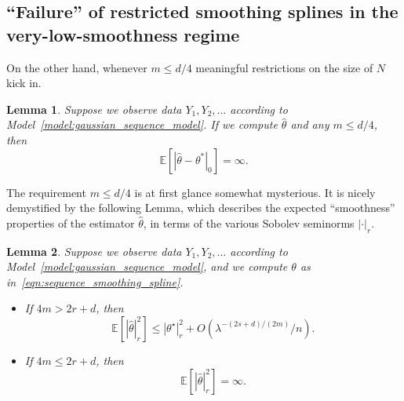 \documentclass{article}
\newcommand{\1}{\mathbf{1}}
\newcommand{\Ebb}{\mathbb{E}}
\newcommand{\wh}[1]{\widehat{#1}}
\theoremstyle{alden}
\theoremstyle{aldenthm}
\newtheorem{lemma}{Lemma}
\theoremstyle{definition}
\theoremstyle{remark}
\begin{document}
\subsection{``Failure'' of restricted smoothing splines in the very-low-smoothness regime}
On the other hand, whenever $m \leq d/4$ meaningful restrictions on the size of $N$ kick in.
\begin{lemma}
	\label{lem:failure_very_low_smoothness}
	Suppose we observe data $Y_1,Y_2,\ldots$ according to Model~\eqref{model:gaussian_sequence_model}. If we compute $\wh{\theta}$ and any $m \leq d/4$, then
	\begin{equation}
	\label{eqn:failure_very_low_smoothness}
	\Ebb[|\wh{\theta} - \theta^{\ast}|_{0}] = \infty.
	\end{equation}
\end{lemma}
The requirement $m \leq d/4$ is at first glance somewhat mysterious. It is nicely demystified by the following Lemma, which describes the expected ``smoothness'' properties of the estimator $\wh{\theta}$, in terms of the various Sobolev seminorms $|\cdot|_r$.
\begin{lemma}
	\label{lem:smoothness_of_sequence_smoothing_splines}
	Suppose we observe data $Y_1,Y_2,\ldots$ according to Model~\eqref{model:gaussian_sequence_model}, and we compute $\theta$ as in~\eqref{eqn:sequence_smoothing_spline}.
	\begin{itemize}
		\item If $4m > 2r + d$, then
		\begin{equation}
		\label{eqn:smoothness_of_sequence_smoothing_splines_1}
		\Ebb[|\wh{\theta}|_{r}^2] \leq |\theta^{\star}|_r^2 + O(\lambda^{-(2s + d)/(2m)}/n).
		\end{equation}
		\item If $4m \leq 2r + d$, then 
		\begin{equation}
		\label{eqn:smoothness_of_sequence_smoothing_splines_2}
		\Ebb[|\wh{\theta}|_{r}^2] = \infty.
		\end{equation}
	\end{itemize}
\end{lemma}
\end{document}
